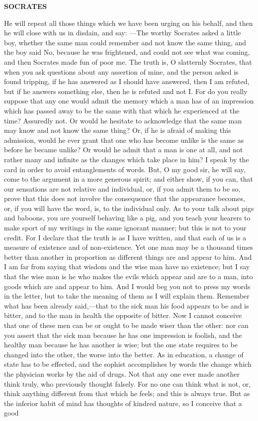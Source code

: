 \documentclass[11pt,letter]{article}
\begin{document}
\par \textbf{SOCRATES}
\par   He will repeat all those things which we have been urging on his behalf, and then he will close with us in disdain, and say: —The worthy Socrates asked a little boy, whether the same man could remember and not know the same thing, and the boy said No, because he was frightened, and could not see what was coming, and then Socrates made fun of poor me. The truth is, O slatternly Socrates, that when you ask questions about any assertion of mine, and the person asked is found tripping, if he has answered as I should have answered, then I am refuted, but if he answers something else, then he is refuted and not I. For do you really suppose that any one would admit the memory which a man has of an impression which has passed away to be the same with that which he experienced at the time? Assuredly not. Or would he hesitate to acknowledge that the same man may know and not know the same thing? Or, if he is afraid of making this admission, would he ever grant that one who has become unlike is the same as before he became unlike? Or would he admit that a man is one at all, and not rather many and infinite as the changes which take place in him? I speak by the card in order to avoid entanglements of words. But, O my good sir, he will say, come to the argument in a more generous spirit; and either show, if you can, that our sensations are not relative and individual, or, if you admit them to be so, prove that this does not involve the consequence that the appearance becomes, or, if you will have the word, is, to the individual only. As to your talk about pigs and baboons, you are yourself behaving like a pig, and you teach your hearers to make sport of my writings in the same ignorant manner; but this is not to your credit. For I declare that the truth is as I have written, and that each of us is a measure of existence and of non-existence. Yet one man may be a thousand times better than another in proportion as different things are and appear to him. And I am far from saying that wisdom and the wise man have no existence; but I say that the wise man is he who makes the evils which appear and are to a man, into goods which are and appear to him. And I would beg you not to press my words in the letter, but to take the meaning of them as I will explain them. Remember what has been already said,—that to the sick man his food appears to be and is bitter, and to the man in health the opposite of bitter. Now I cannot conceive that one of these men can be or ought to be made wiser than the other:  nor can you assert that the sick man because he has one impression is foolish, and the healthy man because he has another is wise; but the one state requires to be changed into the other, the worse into the better. As in education, a change of state has to be effected, and the sophist accomplishes by words the change which the physician works by the aid of drugs. Not that any one ever made another think truly, who previously thought falsely. For no one can think what is not, or, think anything different from that which he feels; and this is always true. But as the inferior habit of mind has thoughts of kindred nature, so I conceive that a good 
\end{document}
